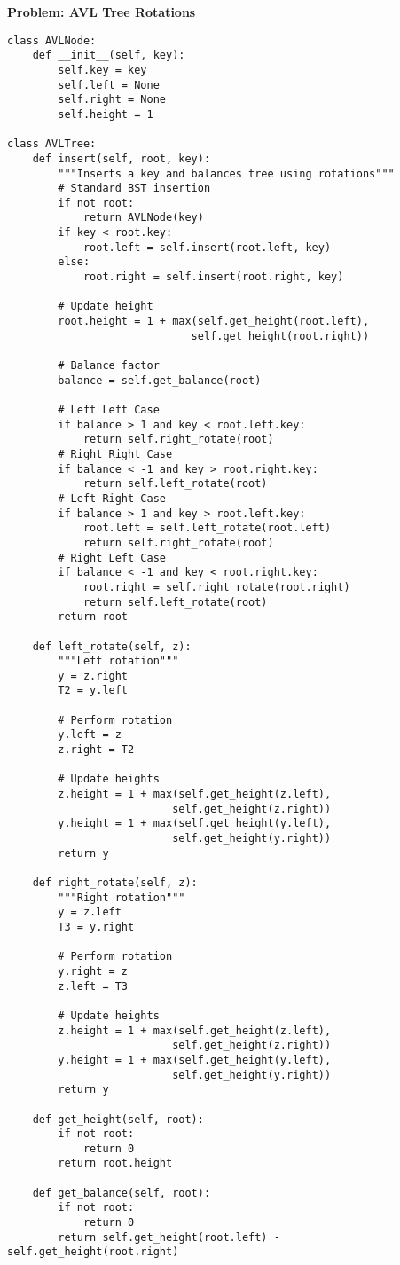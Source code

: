\noindent\textbf{Problem: AVL Tree Rotations}
\begin{verbatim}
class AVLNode:
    def __init__(self, key):
        self.key = key
        self.left = None
        self.right = None
        self.height = 1

class AVLTree:
    def insert(self, root, key):
        """Inserts a key and balances tree using rotations"""
        # Standard BST insertion
        if not root:
            return AVLNode(key)
        if key < root.key:
            root.left = self.insert(root.left, key)
        else:
            root.right = self.insert(root.right, key)
        
        # Update height
        root.height = 1 + max(self.get_height(root.left), 
                             self.get_height(root.right))
        
        # Balance factor
        balance = self.get_balance(root)
        
        # Left Left Case
        if balance > 1 and key < root.left.key:
            return self.right_rotate(root)
        # Right Right Case
        if balance < -1 and key > root.right.key:
            return self.left_rotate(root)
        # Left Right Case
        if balance > 1 and key > root.left.key:
            root.left = self.left_rotate(root.left)
            return self.right_rotate(root)
        # Right Left Case
        if balance < -1 and key < root.right.key:
            root.right = self.right_rotate(root.right)
            return self.left_rotate(root)
        return root

    def left_rotate(self, z):
        """Left rotation"""
        y = z.right
        T2 = y.left
        
        # Perform rotation
        y.left = z
        z.right = T2
        
        # Update heights
        z.height = 1 + max(self.get_height(z.left), 
                          self.get_height(z.right))
        y.height = 1 + max(self.get_height(y.left), 
                          self.get_height(y.right))
        return y

    def right_rotate(self, z):
        """Right rotation"""
        y = z.left
        T3 = y.right
        
        # Perform rotation
        y.right = z
        z.left = T3
        
        # Update heights
        z.height = 1 + max(self.get_height(z.left), 
                          self.get_height(z.right))
        y.height = 1 + max(self.get_height(y.left), 
                          self.get_height(y.right))
        return y

    def get_height(self, root):
        if not root:
            return 0
        return root.height

    def get_balance(self, root):
        if not root:
            return 0
        return self.get_height(root.left) - self.get_height(root.right)
\end{verbatim}

